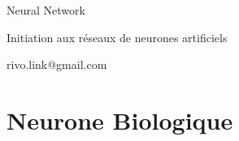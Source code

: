 \documentclass{article}
\begin{document}
\vspace*{\fill}
\begingroup
\centering

Neural Network

\vspace{3mm}
Initiation aux réseaux de neurones artificiels

\vspace{5mm} 
rivo.link@gmail.com

\endgroup
\vspace*{\fill}

\newpage

\section{Neurone Biologique}
\end{document}

